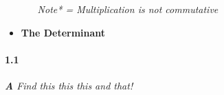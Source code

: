 \documentclass[12pt]{article}
\begin{document}
\begin{flushleft}
\begin{itemize}
\begin{flushleft}
\begin{itemize}
\textit{Note*  = Multiplication is not commutative }

	\end{itemize}
\end{flushleft}
		
\item \textbf{The Determinant}
		
		\end{itemize}
	\end{flushleft}
	
	
	\paragraph{1.1}
	\textit{
		\textbf{A}	Find this this this and that!
	}
\end{document}
